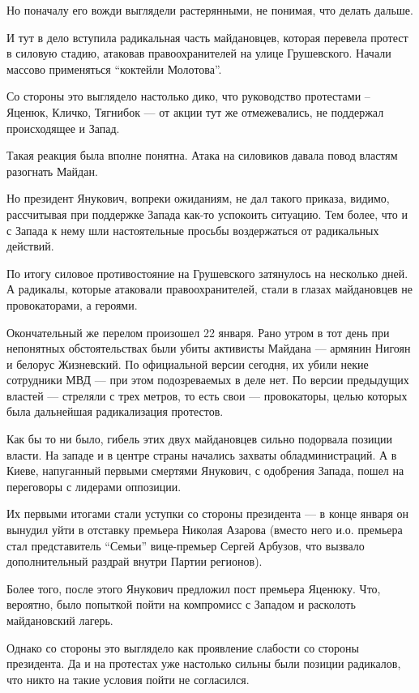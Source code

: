 Но поначалу его вожди выглядели растерянными, не понимая, что делать
дальше. 

И тут в дело вступила радикальная часть майдановцев, которая перевела
протест в силовую стадию, атаковав правоохранителей на улице Грушевского.
Начали массово применяться \enquote{коктейли Молотова}.

Со стороны это выглядело настолько дико, что руководство протестами –
Яценюк, Кличко, Тягнибок --- от акции тут же отмежевались, не поддержал
происходящее и Запад.

Такая реакция была вполне понятна. Атака на силовиков давала повод властям
разогнать Майдан. 

Но президент Янукович, вопреки ожиданиям, не дал такого приказа, видимо,
рассчитывая при поддержке Запада как-то успокоить ситуацию. Тем более, что
и с Запада к нему шли настоятельные просьбы воздержаться от радикальных
действий.

По итогу силовое противостояние на Грушевского затянулось на несколько
дней. А радикалы, которые атаковали правоохранителей, стали в глазах
майдановцев не провокаторами, а героями.  

Окончательный же перелом произошел 22 января. Рано утром в тот день при
непонятных обстоятельствах были убиты активисты Майдана --- армянин Нигоян и
белорус Жизневский. По официальной версии сегодня, их убили некие
сотрудники МВД --- при этом подозреваемых в деле нет. По версии предыдущих
властей --- стреляли с трех метров, то есть свои --- провокаторы, целью
которых была дальнейшая радикализация протестов.

Как бы то ни было, гибель этих двух майдановцев сильно подорвала позиции
власти. На западе и в центре страны начались захваты обладминистраций. А в
Киеве, напуганный первыми смертями Янукович, с одобрения Запада, пошел на
переговоры с лидерами оппозиции. 

Их первыми итогами стали уступки со стороны президента --- в конце января он
вынудил уйти в отставку премьера Николая Азарова (вместо него и.о.
премьера стал представитель \enquote{Семьи} вице-премьер Сергей Арбузов, что
вызвало дополнительный раздрай внутри Партии регионов). 

Более того, после этого Янукович предложил пост премьера Яценюку. Что,
вероятно, было  попыткой пойти на компромисс с Западом и расколоть
майдановский лагерь.

Однако со стороны это выглядело как проявление слабости со стороны
президента. Да и на протестах уже настолько сильны были позиции радикалов,
что никто на такие условия пойти не согласился. 


